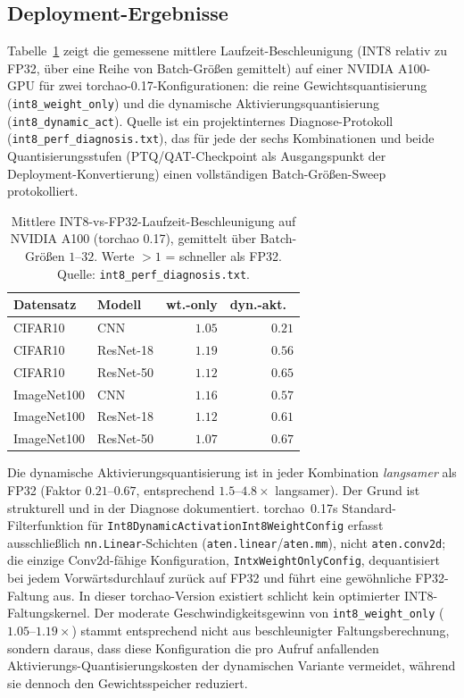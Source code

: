 \subsection{Deployment-Ergebnisse}
\label{sec:phase10}

Tabelle~\ref{tab:deployment} zeigt die gemessene mittlere Laufzeit-Beschleunigung (INT8 relativ zu FP32, über eine Reihe von Batch-Größen gemittelt) auf einer NVIDIA A100-GPU für zwei torchao-0.17-Konfigurationen: die reine Gewichtsquantisierung (\texttt{int8\_weight\_only}) und die dynamische Aktivierungsquantisierung (\texttt{int8\_dynamic\_act}). Quelle ist ein projektinternes Diagnose-Protokoll (\texttt{int8\_perf\_diagnosis.txt}), das für jede der sechs Kombinationen und beide Quantisierungsstufen (PTQ/QAT-Checkpoint als Ausgangspunkt der Deployment-Konvertierung) einen vollständigen Batch-Größen-Sweep protokolliert.

\begin{table}[t]
\centering
\small
\caption{Mittlere INT8-vs-FP32-Laufzeit-Beschleunigung auf NVIDIA A100 (torchao 0.17), gemittelt über Batch-Größen $1$--$32$. Werte $>1$ = schneller als FP32. Quelle: \texttt{int8\_perf\_diagnosis.txt}.}
\label{tab:deployment}
\begin{tabular}{llrr}
\toprule
Datensatz & Modell & wt.-only & dyn.-akt.\ \\
\midrule
CIFAR10 & CNN & $1.05$ & $0.21$ \\
CIFAR10 & ResNet-18 & $1.19$ & $0.56$ \\
CIFAR10 & ResNet-50 & $1.12$ & $0.65$ \\
ImageNet100 & CNN & $1.16$ & $0.57$ \\
ImageNet100 & ResNet-18 & $1.12$ & $0.61$ \\
ImageNet100 & ResNet-50 & $1.07$ & $0.67$ \\
\bottomrule
\end{tabular}
\end{table}

Die dynamische Aktivierungsquantisierung ist in jeder Kombination \emph{langsamer} als FP32 (Faktor $0.21$--$0.67$, entsprechend $1.5$--$4.8\times$ langsamer). Der Grund ist strukturell und in der Diagnose dokumentiert. torchao~0.17s Standard-Filterfunktion für \texttt{Int8DynamicActivationInt8WeightConfig} erfasst ausschließlich \texttt{nn.Linear}-Schichten (\texttt{aten.linear}/\texttt{aten.mm}), nicht \texttt{aten.conv2d}; die einzige Conv2d-fähige Konfiguration, \texttt{IntxWeightOnlyConfig}, dequantisiert bei jedem Vorwärtsdurchlauf zurück auf FP32 und führt eine gewöhnliche FP32-Faltung aus. In dieser torchao-Version existiert schlicht kein optimierter INT8-Faltungskernel. Der moderate Geschwindigkeitsgewinn von \texttt{int8\_weight\_only} ($1.05$--$1.19\times$) stammt entsprechend nicht aus beschleunigter Faltungsberechnung, sondern daraus, dass diese Konfiguration die pro Aufruf anfallenden Aktivierungs-Quantisierungskosten der dynamischen Variante vermeidet, während sie dennoch den Gewichtsspeicher reduziert.
\par\medskip

